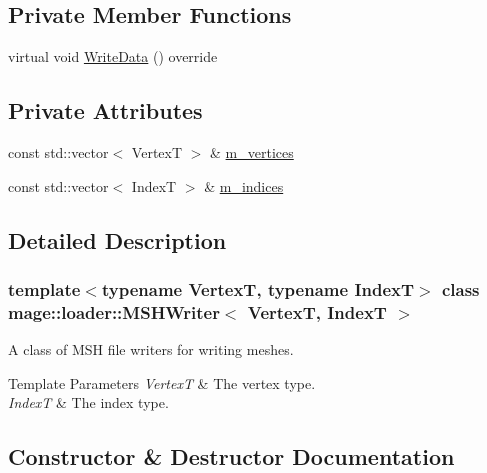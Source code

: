 \subsection*{Private Member Functions}
\begin{DoxyCompactItemize}
\item 
virtual void \hyperlink{classmage_1_1loader_1_1_m_s_h_writer_ae1e53fa4139266fa88c9ee581dbf35b7}{Write\+Data} () override
\end{DoxyCompactItemize}
\subsection*{Private Attributes}
\begin{DoxyCompactItemize}
\item 
const std\+::vector$<$ VertexT $>$ \& \hyperlink{classmage_1_1loader_1_1_m_s_h_writer_a2d7b69d324cbcdf12ad80b739effc548}{m\+\_\+vertices}
\item 
const std\+::vector$<$ IndexT $>$ \& \hyperlink{classmage_1_1loader_1_1_m_s_h_writer_a1775d9f0ff180f40ee7964ff98226a41}{m\+\_\+indices}
\end{DoxyCompactItemize}


\subsection{Detailed Description}
\subsubsection*{template$<$typename VertexT, typename IndexT$>$\newline
class mage\+::loader\+::\+M\+S\+H\+Writer$<$ Vertex\+T, Index\+T $>$}

A class of M\+SH file writers for writing meshes.


\begin{DoxyTemplParams}{Template Parameters}
{\em VertexT} & The vertex type. \\
\hline
{\em IndexT} & The index type. \\
\hline
\end{DoxyTemplParams}


\subsection{Constructor \& Destructor Documentation}
\hypertarget{classmage_1_1loader_1_1_m_s_h_writer_a71c1711cbf4f299bb894136742d925e6}{}\label{classmage_1_1loader_1_1_m_s_h_writer_a71c1711cbf4f299bb894136742d925e6} 
